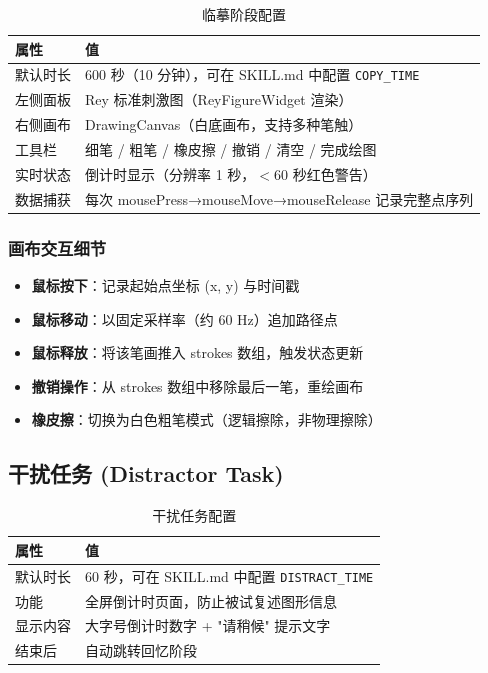 \documentclass[12pt,a4paper]{ctexart}
\begin{document}
\begin{table}[h]
\centering
\begin{tabular}{ll}
\toprule
\textbf{属性} & \textbf{值} \\
\midrule
默认时长 & 600 秒（10 分钟），可在 SKILL.md 中配置 \texttt{COPY\_TIME} \\
左侧面板 & Rey 标准刺激图（ReyFigureWidget 渲染） \\
右侧画布 & DrawingCanvas（白底画布，支持多种笔触） \\
工具栏   & 细笔 / 粗笔 / 橡皮擦 / 撤销 / 清空 / 完成绘图 \\
实时状态 & 倒计时显示（分辨率 1 秒，$<$60 秒红色警告） \\
数据捕获 & 每次 mousePress→mouseMove→mouseRelease 记录完整点序列 \\
\bottomrule
\end{tabular}
\caption{临摹阶段配置}
\end{table}

\subsubsection{画布交互细节}

\begin{itemize}[leftmargin=*]
  \item \textbf{鼠标按下}：记录起始点坐标 (x, y) 与时间戳
  \item \textbf{鼠标移动}：以固定采样率（约 60 Hz）追加路径点
  \item \textbf{鼠标释放}：将该笔画推入 strokes 数组，触发状态更新
  \item \textbf{撤销操作}：从 strokes 数组中移除最后一笔，重绘画布
  \item \textbf{橡皮擦}：切换为白色粗笔模式（逻辑擦除，非物理擦除）
\end{itemize}

\subsection{干扰任务 (Distractor Task)}

\begin{table}[h]
\centering
\begin{tabular}{ll}
\toprule
\textbf{属性} & \textbf{值} \\
\midrule
默认时长 & 60 秒，可在 SKILL.md 中配置 \texttt{DISTRACT\_TIME} \\
功能     & 全屏倒计时页面，防止被试复述图形信息 \\
显示内容 & 大字号倒计时数字 + "请稍候" 提示文字 \\
结束后   & 自动跳转回忆阶段 \\
\bottomrule
\end{tabular}
\caption{干扰任务配置}
\end{table}
\end{document}
